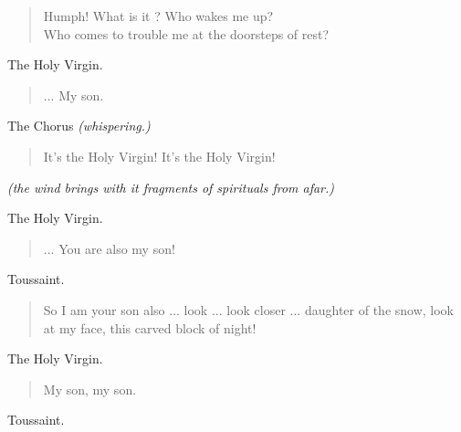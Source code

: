 \documentclass[letterpaper,article,12pt,oneside,notitlepage]{memoir}
\begin{document}
\begin{verse}
Humph! What is it ? Who wakes me up? \\
Who comes to trouble me at the doorsteps of rest? \\
\end{verse}

\begin{center}The Holy Virgin.\end{center}

\begin{verse}
\hspace{1cm} ... My son. \\
\end{verse}

\begin{center}The Chorus \textit{(whispering.)}\end{center}

\begin{verse}
It's the Holy Virgin! It's the Holy Virgin! \\
\end{verse}

\textit{(the wind brings with it fragments of spirituals from afar.)}

\clearpage

\begin{center}The Holy Virgin.\end{center}

\begin{verse}
... You are also my son! \\
\end{verse}

\begin{center}Toussaint.\end{center}

\begin{verse}
So I am your son also ... look ... look closer ... daughter of the snow, look at my face, this carved block of night!  \\
\end{verse}

\begin{center}The Holy Virgin.\end{center}

\begin{verse}
\hspace{1cm} My son, my son. \\
\end{verse}

\begin{center}Toussaint.\end{center}
\end{document}
